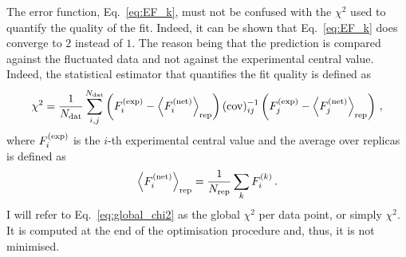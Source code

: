 The error function, Eq.~\eqref{eq:EF_k}, must not be confused with the $\chi^2$ used to quantify the quality of the fit. Indeed, it can be shown that Eq.~\eqref{eq:EF_k} does converge to $2$ instead of $1$. The reason being that the prediction is compared against the fluctuated data and not against the experimental central value. Indeed, the statistical estimator that quantifies the fit quality is defined as
\begin{equation}
  \chi^2 = \frac{1}{N_{\textrm{dat}}} \sum_{i,j}^{N_{\textrm{dat}}} \left( F_{i}^{\textrm{(exp)}} - \left<F_{i}^{\textrm{(net)}}\right>_{\textrm{rep}} \right) (\textrm{cov})^{-1}_{ij} \left( F_{j}^{\textrm{(exp)}} - \left<F_{j}^{\textrm{(net)}}\right>_{\textrm{rep}} \right) \,,
  \label{eq:global_chi2}
\end{equation}
where $F_{i}^{\textrm{(exp)}}$ is the $i$-th experimental central value and the average over replicas is defined as
\begin{equation}
  \left< F_i^{\textrm{(net)}} \right>_{\textrm{rep}} = \frac{1}{N_{\textrm{rep}}} \sum_{k} F^{(k)}_i \,.
\end{equation}
I will refer to Eq.~\eqref{eq:global_chi2} as the global $\chi^2$ per data point, or simply $\chi^2$. It is computed at the end of the optimisation procedure and, thus, it is not minimised.%

